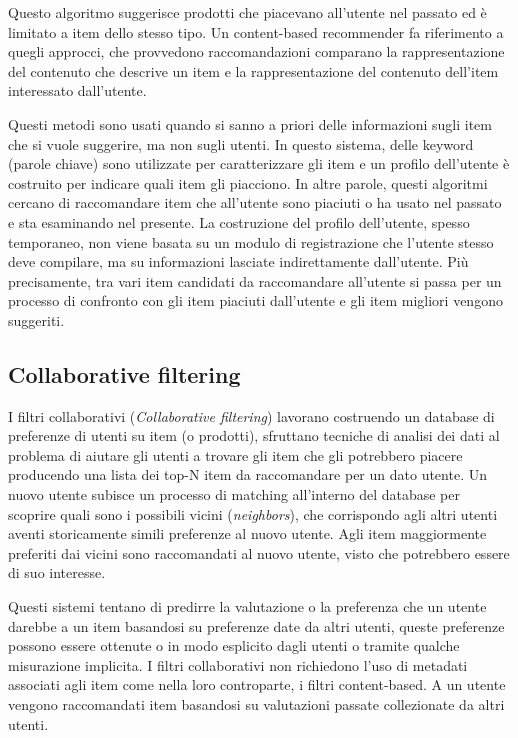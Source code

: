 Questo algoritmo suggerisce prodotti che piacevano all'utente nel passato ed è limitato a item dello stesso tipo. Un 
content-based recommender fa riferimento a quegli approcci, che provvedono raccomandazioni comparano la rappresentazione del
contenuto che descrive un item e la rappresentazione del contenuto dell'item interessato dall'utente. 

Questi metodi sono usati quando si sanno a priori delle informazioni sugli item che si vuole suggerire, ma non sugli utenti.
In questo sistema, delle keyword (parole chiave) sono utilizzate per caratterizzare gli item e un profilo dell'utente è 
costruito per indicare quali item gli piacciono. In altre parole, questi algoritmi cercano di raccomandare item che 
all'utente sono piaciuti o ha usato nel passato e sta esaminando nel presente. La costruzione del profilo dell'utente,
spesso temporaneo, non viene basata su un modulo di registrazione che l'utente stesso deve compilare, ma su informazioni
lasciate indirettamente dall'utente. Più precisamente, tra vari item candidati da raccomandare all'utente si passa per un 
processo di confronto con gli item piaciuti dall'utente e gli item migliori vengono suggeriti.


\subsection{Collaborative filtering}
I filtri collaborativi (\textit{Collaborative filtering}) lavorano costruendo un database di preferenze di utenti su item (o prodotti),
sfruttano tecniche di analisi dei dati al problema di aiutare gli utenti a trovare gli item che gli potrebbero piacere producendo una 
lista dei top-N item da raccomandare per un dato utente.
Un nuovo utente subisce un processo di matching all'interno del database per scoprire quali sono i possibili vicini (\textit{neighbors}),
che corrispondo agli altri utenti aventi storicamente simili preferenze al nuovo utente. Agli item maggiormente preferiti dai vicini sono
raccomandati al nuovo utente, visto che potrebbero essere di suo interesse. 

Questi sistemi tentano di predirre la valutazione o la preferenza che un utente darebbe a un item basandosi su preferenze date da altri 
utenti, queste preferenze possono essere ottenute o in modo esplicito dagli utenti o tramite qualche misurazione implicita. 
I filtri collaborativi non richiedono l'uso di metadati associati agli item come nella loro controparte, i filtri content-based. A un 
utente vengono raccomandati item basandosi su valutazioni passate collezionate da altri utenti.

